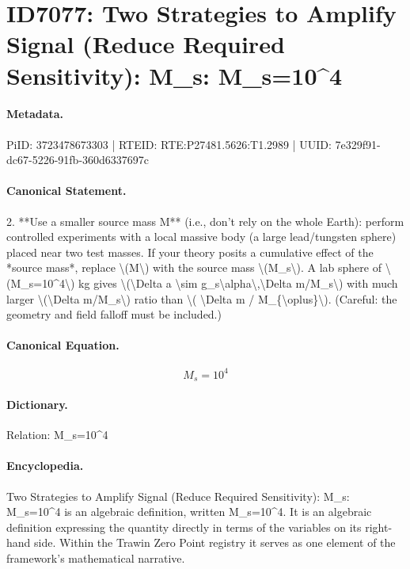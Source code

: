 \section*{ID7077: Two Strategies to Amplify Signal (Reduce Required Sensitivity): M\_s: M\_s=10\textasciicircum{}4}
\paragraph{Metadata.}
PiID: 3723478673303 | RTEID: RTE:P27481.5626:T1.2989 | UUID: 7e329f91-dc67-5226-91fb-360d6337697c

\paragraph{Canonical Statement.}
2. **Use a smaller source mass M** (i.e., don’t rely on the whole Earth): perform controlled experiments with a local massive body (a large lead/tungsten sphere) placed near two test masses. If your theory posits a cumulative effect of the *source mass*, replace \textbackslash{}(M\textbackslash{}) with the source mass \textbackslash{}(M\_s\textbackslash{}). A lab sphere of \textbackslash{}(M\_s=10\textasciicircum{}4\textbackslash{}) kg gives \textbackslash{}(\textbackslash{}Delta a \textbackslash{}sim g\_s\textbackslash{}alpha\textbackslash{},\textbackslash{}Delta m/M\_s\textbackslash{}) with much larger \textbackslash{}(\textbackslash{}Delta m/M\_s\textbackslash{}) ratio than \textbackslash{}( \textbackslash{}Delta m / M\_\{\textbackslash{}oplus\}\textbackslash{}). (Careful: the geometry and field falloff must be included.)

\paragraph{Canonical Equation.}
\[
M_s=10^4
\]

\paragraph{Dictionary.}
Relation: M\_s=10\textasciicircum{}4

\paragraph{Encyclopedia.}
Two Strategies to Amplify Signal (Reduce Required Sensitivity): M\_s: M\_s=10\textasciicircum{}4 is an algebraic definition, written M\_s=10\textasciicircum{}4. It is an algebraic definition expressing the quantity directly in terms of the variables on its right-hand side. Within the Trawin Zero Point registry it serves as one element of the framework's mathematical narrative.
